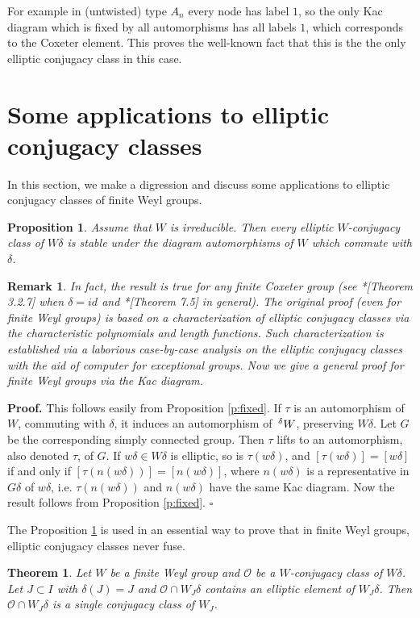 \documentclass[10pt,leqno]{article}
\newtheorem{theorem}[equation]{Theorem}
\newtheorem{proposition}[equation]{Proposition}
\newtheorem{remark}[equation]{Remark}
{\theorembodyfont{\rmfamily}
\newtheorem{theoremplain}[equation]{Theorem}
\newtheorem{remarkplain}[equation]{Remark}
\newtheorem{editorialremarkplain}[equation]{Editorial Remark}
\newtheorem{exampleplain}[equation]{Example}
\newtheorem{corollaryplain}[equation]{Corollary}
}
\newcommand{\qed}{\hfill $\square$ \medskip}
\newenvironment{proof}[1][Proof]{\noindent\textbf{#1.} }{\qed}
\renewcommand{\sec}[1]{\section{#1}
\renewcommand{\theequation}{\thesection.\arabic{equation}}
  \setcounter{equation}{0}}
\newcommand{\Wext}{\negthinspace\negthinspace\phantom{a}^\delta W}
\def\d{\delta}
\renewcommand{\sec}[1]{\section{#1}
\renewcommand{\theequation}{\thesection.\arabic{equation}}
  \setcounter{equation}{0}}
\begin{document}
For example in (untwisted) type $A_n$ every node has label $1$, so the
only Kac diagram which is fixed by all automorphisms has all labels
$1$, which corresponds to the Coxeter element. This proves the well-known fact
that this is the the only elliptic conjugacy class in this case.


\sec{Some applications to elliptic conjugacy classes}
In this section, we make a digression and discuss some applications to elliptic conjugacy classes of finite Weyl groups. 

\begin{proposition}\label{stable-d'}
Assume that $W$ is irreducible. Then every elliptic $W$-conjugacy class of $W\delta$ is stable under the diagram automorphisms of $W$
which commute with $\delta$.
\end{proposition}

\begin{remark}
  In fact, the result is true for any finite Coxeter group (see \cite{geck_pfeiffer}*[Theorem 3.2.7] when $\d=id$ and
  \cite{he_minimal_length_double_cosets}*[Theorem 7.5] in general). The original proof (even for finite Weyl groups) is based on a characterization of elliptic conjugacy classes via the characteristic polynomials and length functions. Such characterization is established via a laborious case-by-case analysis on the elliptic conjugacy classes with the aid of computer for exceptional groups. Now we give a general proof for finite Weyl groups via the Kac diagram. 
\end{remark}

\begin{proof}
  This follows easily from Proposition \ref{p:fixed}. If $\tau$ is an
  automorphism of $W$, commuting with $\delta$, it induces an
  automorphism of $\Wext$, preserving $W\delta$. Let $G$ be the corresponding simply connected group.
  Then $\tau$ lifts to an automorphism, also denoted $\tau$, of $G$.
  If $w\delta\in W\delta$ is elliptic, so is $\tau(w\delta)$, and
  $[\tau(w\delta)]=[w\delta]$ if and only if $[\tau(n(w\delta))]=[n(w\delta)]$, where $n(w\delta)$ is a representative
  in $G\delta$ of $w\delta$, i.e. $\tau(n(w\delta))$ and $n(w\delta)$ have the same Kac diagram.
  Now the result follows from Proposition \ref{p:fixed}.
\end{proof}

The Proposition \ref{stable-d'} is used in an essential way to prove that in finite Weyl groups, elliptic conjugacy classes never fuse. 

\begin{theorem}\label{fuse}
	Let $W$ be a finite Weyl group and $\mathcal O$ be a $W$-conjugacy class of $W \d$. Let $J \subset I$ with $\d(J)=J$ and $\mathcal O \cap W_J \d$ contains an elliptic element of $W_J \d$. Then $\mathcal O \cap W_J \d$ is a single conjugacy class of $W_J$. 
\end{theorem}
\end{document}
